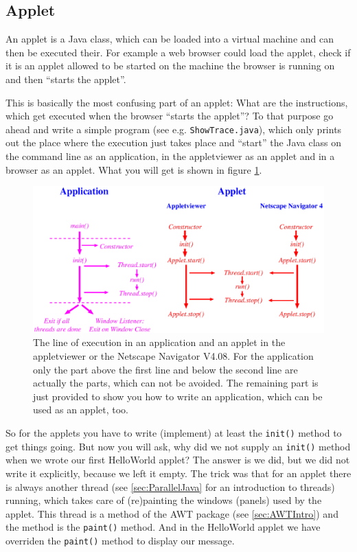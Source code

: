 \subsection{Applet}
An applet is a Java class, which can be loaded into a virtual machine
and can then be executed their. For example a web browser could load
the applet, check if it is an applet allowed to be started on the
machine the browser is running on and then ``starts the applet''.

This is basically the most confusing part of an applet: What are the
instructions, which get executed when the browser ``starts the applet''?
To that purpose go ahead and write a simple program 
(see e.g. \verb|ShowTrace.java|), which only 
prints out the place where the execution just takes place and ``start''
the Java class on the command line as an application, in the appletviewer
as an applet and in a browser as an applet. What you will get is shown
in figure \ref{fig:LineOfExecution}.
\begin{figure}[htbp]
  \begin{center}
    \leavevmode
    \includegraphics[width=\textwidth]{Figures/LineOfExecution.eps}
    \caption{The line of execution in an application and an applet in
        the appletviewer or the Netscape Navigator V4.08. For the application
        only the part above the first line and below the second line are
        actually the parts, which can not be avoided. The remaining
        part is just provided to show you how to write an application,
        which can be used as an applet, too.}
    \label{fig:LineOfExecution}
  \end{center}
\end{figure}

So for the applets you have to write (implement) at least the 
\verb|init()| method to get things going. But now you will ask, why did we
not supply an  \verb|init()| method when we wrote our first 
HelloWorld applet? The answer is we did, but we did not write it explicitly,
because we left it empty. The trick was that for an applet there is
always another thread (see \ref{sec:ParallelJava} for an introduction to threads)
running, which takes care of (re)painting the windows (panels) used by the applet.
This thread is a method of the AWT package (see \ref{sec:AWTIntro}) and
the method is the \verb|paint()| method. And in the    HelloWorld applet
we have overriden the \verb|paint()| method to display our message.

